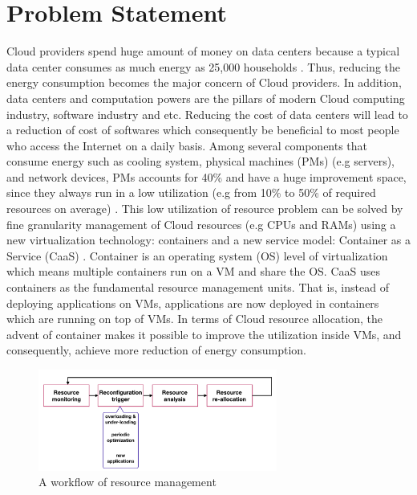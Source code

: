 \section{Problem Statement}

Cloud providers spend huge amount of money on data centers because a typical data center consumes as much energy as 25,000 households \cite{Dayarathna:2016ua}. Thus, reducing the energy consumption becomes the major concern of Cloud providers. 
In addition, data centers and computation powers are the pillars of modern Cloud computing industry, software industry and etc. Reducing the cost of data centers will lead to a reduction of cost of softwares which consequently be beneficial to most people who access the Internet on a daily basis.
Among several components that consume energy such as cooling system, physical machines (PMs) (e.g servers), and network devices, PMs accounts for 40\% and have a huge improvement space, since they always run in a low utilization (e.g from 10\% to 50\% of required resources on average) \cite{Barroso:2007jt,Shen:2015hm}. This low utilization of resource problem can be solved by fine granularity management of Cloud resources (e.g CPUs and RAMs) using a new virtualization technology: containers \cite{Felter:2015ki, Soltesz:2007cu} and a new service model: Container as a Service (CaaS) \cite{Piraghaj:2015uf}. Container is an operating system (OS) level of virtualization which means multiple containers  run on a VM and share the OS. CaaS uses containers as the fundamental resource management units.  That is, instead of deploying applications on VMs, applications are now deployed in containers which are running on top of VMs. In terms of Cloud resource allocation, the advent of container makes it possible to improve the utilization inside VMs, and consequently, achieve more reduction of energy consumption. 


\begin{figure}
	\centering
	\includegraphics[width=0.7\textwidth]{pics/workflow_management.png}
	\caption{A workflow of resource management \cite{Mishra:2012kx}}
	\label{fig:workflow}
\end{figure}

